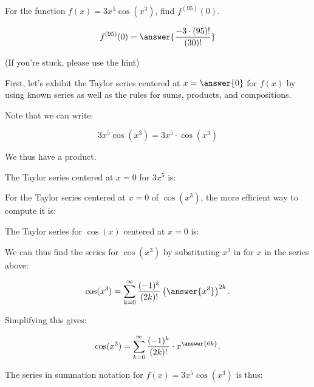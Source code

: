 \documentclass{ximera}
\author{Jim Talamo}
\begin{document}
\begin{exercise}
For the function $f(x) = 3x^5 \cos(x^3)$, find $f^{(95)}(0)$.

\[
f^{(95)}(0) = \answer{\frac{-3 \cdot (95)!}{(30)!}}
\]

(If you're stuck, please use the hint)

\begin{hint}
First, let's exhibit the Taylor series centered at $x=\answer{0}$ for $f(x)$ by using known series as well as the rules for sums, products, and compositions.

Note that we can write:

\[
3x^5 \cos(x^3) =  3x^5 \cdot \cos(x^3)
\]

We thus have a product.  

The Taylor series centered at $x=0$ for $3x^5$ is:
\begin{multipleChoice}
\end{multipleChoice}

For the Taylor series centered at $x=0$ of $ \cos(x^3)$, the more efficient way to compute it is:
\begin{multipleChoice}
\end{multipleChoice}

The Taylor series for $\cos(x)$ centered at $x=0$ is:

\begin{multipleChoice}
\end{multipleChoice}
We can thus find the series for  $ \cos(x^3)$ by substituting $x^3$ in for $x$ in the series above:

\[
\cos(x^3) = \sum_{k=0}^{\infty} \frac{(-1)^k}{(2k)!}\left(\answer{x^3}\right)^{2k}.
\]

Simplifying this gives:

\[
\cos(x^3) = \sum_{k=0}^{\infty} \frac{(-1)^k}{(2k)!} \cdot x^{\answer{6k}}.
\]

\begin{question}
The series in summation notation for $f(x) =3x^5 \cos(x^3)$ is thus:


\end{question}
\end{hint}
\end{exercise}
\end{document}
